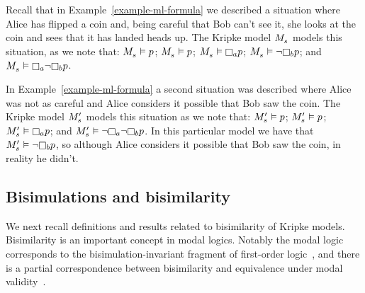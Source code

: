 \begin{example}
Recall that in Example~\ref{example-ml-formula} we described a situation where Alice has flipped a coin and, being careful that Bob can't see it, she looks at the coin and sees that it has landed heads up.
The Kripke model $\kPModel{\kStateS}$ models this situation, as we note that:
$\kPModel{\kStateS} \entails \atomP$;
$\kPModel{\kStateS} \entails \atomP$;
$\kPModel{\kStateS} \entails \knowsA \atomP$;
$\kPModel{\kStateS} \entails \lnot \knowsB \atomP$; and
$\kPModel{\kStateS} \entails \knowsA \lnot \knowsB \atomP$.

In Example~\ref{example-ml-formula} a second situation was described where Alice was not as careful and Alice considers it possible that Bob saw the coin.
The Kripke model $\kPModelP{\kStateS}$ models this situation as we note that:
$\kPModelP{\kStateS} \entails \atomP$;
$\kPModelP{\kStateS} \entails \atomP$;
$\kPModelP{\kStateS} \entails \knowsA \atomP$; and
$\kPModelP{\kStateS} \entails \lnot \knowsA \lnot \knowsB \atomP$.
In this particular model we have that $\kPModelP{\kStateS} \entails \lnot \knowsB \atomP$, so although Alice considers it possible that Bob saw the coin, in reality he didn't.
\end{example}

\subsection{Bisimulations and bisimilarity}

We next recall definitions and results related to bisimilarity of Kripke models.
Bisimilarity is an important concept in modal logics.
Notably the modal logic \logicK{} corresponds to the bisimulation-invariant fragment of first-order logic~\cite{vanbenthem:1984}, and there is a partial correspondence between bisimilarity and equivalence under modal validity~\cite{goranko:2006}.

